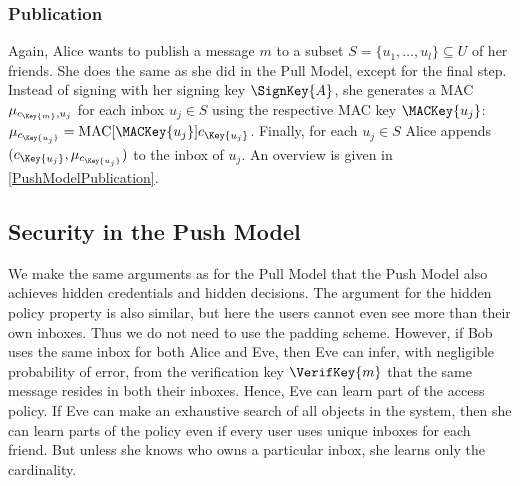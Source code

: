 \subsubsection<article>{Publication}

Again, Alice wants to publish a message \(m\) to a subset \(S = \{u_1, \ldots, 
  u_l\}\subseteq U\) of her friends.
She does the same as she did in the Pull Model, except for the final step.
Instead of signing with her signing key \(\SignKey{A}\), she generates 
a \ac{MAC} \(\mu_{c_{\Key{m}}, u_j}\) for each inbox \(u_j\in S\) using the 
respective \ac{MAC} key \(\MACKey{u_j}\): \(\mu_{c_{\Key{u_j}}} 
  = \MAC[\MACKey{u_j}]{ c_{\Key{u_j}} }\).
Finally, for each \(u_j\in S\) Alice appends \((c_{\Key{u_j}}, 
  \mu_{c_{\Key{u_j}}})\) to the inbox of \(u_j\).
An overview is given in \cref{PushModelPublication}.

\subsection<article>{Security in the Push Model}\label{sec:PushModelSec}


We make the same arguments as for the Pull Model that the Push Model also 
achieves hidden credentials and hidden decisions.
The argument for the hidden policy property is also similar, but here the users 
cannot even see more than their own inboxes.
Thus we do not need to use the padding scheme.
However, if Bob uses the same inbox for both Alice and Eve, then Eve can infer, 
with negligible probability of error, from the verification key 
\(\VerifKey{m}\) that the same message resides in both their inboxes.
Hence, Eve can learn part of the access policy.
If Eve can make an exhaustive search of all objects in the system, then she can 
learn parts of the policy even if every user uses unique inboxes for each 
friend.
But unless she knows who owns a particular inbox, she learns only the 
cardinality.

